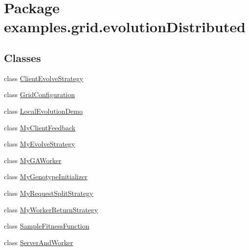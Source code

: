 \hypertarget{namespaceexamples_1_1grid_1_1evolution_distributed}{\section{Package examples.\-grid.\-evolution\-Distributed}
\label{namespaceexamples_1_1grid_1_1evolution_distributed}
}
\subsection*{Classes}
\begin{DoxyCompactItemize}
\item 
class \hyperlink{classexamples_1_1grid_1_1evolution_distributed_1_1_client_evolve_strategy}{Client\-Evolve\-Strategy}
\item 
class \hyperlink{classexamples_1_1grid_1_1evolution_distributed_1_1_grid_configuration}{Grid\-Configuration}
\item 
class \hyperlink{classexamples_1_1grid_1_1evolution_distributed_1_1_local_evolution_demo}{Local\-Evolution\-Demo}
\item 
class \hyperlink{classexamples_1_1grid_1_1evolution_distributed_1_1_my_client_feedback}{My\-Client\-Feedback}
\item 
class \hyperlink{classexamples_1_1grid_1_1evolution_distributed_1_1_my_evolve_strategy}{My\-Evolve\-Strategy}
\item 
class \hyperlink{classexamples_1_1grid_1_1evolution_distributed_1_1_my_g_a_worker}{My\-G\-A\-Worker}
\item 
class \hyperlink{classexamples_1_1grid_1_1evolution_distributed_1_1_my_genotype_initializer}{My\-Genotype\-Initializer}
\item 
class \hyperlink{classexamples_1_1grid_1_1evolution_distributed_1_1_my_request_split_strategy}{My\-Request\-Split\-Strategy}
\item 
class \hyperlink{classexamples_1_1grid_1_1evolution_distributed_1_1_my_worker_return_strategy}{My\-Worker\-Return\-Strategy}
\item 
class \hyperlink{classexamples_1_1grid_1_1evolution_distributed_1_1_sample_fitness_function}{Sample\-Fitness\-Function}
\item 
class \hyperlink{classexamples_1_1grid_1_1evolution_distributed_1_1_server_and_worker}{Server\-And\-Worker}
\end{DoxyCompactItemize}
